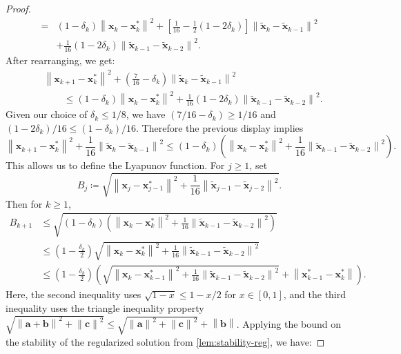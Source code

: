 \documentclass[letterpaper,11pt]{article}
\newcommand{\parenth}[1]{\left( #1 \right)}
\newcommand{\norm}[1]{\left\| #1 \right\|}
\newcommand{\vect}[1]{\mathbf{#1}}
\begin{document}
\begin{proof}
\begin{align*}
=& \left(1-\delta_k\right)\norm{\vect{x}_k - \vect{x}_k^*}^2 + \left[\frac{1}{16} - \frac{1}{2}\left(1- 2 \delta_k\right)\right]\norm{\tilde{\vect{x}}_k - \tilde{\vect{x}}_{k-1}}^2 \\
& + \frac{1}{16}\left(1-2\delta_k\right)\norm{\tilde{\vect{x}}_{k-1} - \tilde{\vect{x}}_{k-2}}^2.
\end{align*}
After rearranging, we get:
\[
\begin{aligned}
&\norm{\vect{x}_{k+1} - \vect{x}_k^*}^2
+ \parenth{\frac{7}{16} - \delta_k}
    \norm{\tilde{\vect{x}}_k - \tilde{\vect{x}}_{k-1}}^2 \\
&\qquad\le
\left(1-\delta_k\right)\norm{\vect{x}_k - \vect{x}_k^*}^2
+ \frac{1}{16}\left(1-2\delta_k\right)
    \norm{\tilde{\vect{x}}_{k-1} - \tilde{\vect{x}}_{k-2}}^2.
\end{aligned}
\]
Given our choice of $\delta_k \le 1/8$, we have \((7/16-\delta_k)\ge1/16\) and \((1-2\delta_k)/16\le(1-\delta_k)/16\). Therefore the previous display implies
\[
\norm{\vect{x}_{k+1} - \vect{x}_k^*}^2
+\frac{1}{16}\norm{\tilde{\vect{x}}_k - \tilde{\vect{x}}_{k-1}}^2
\le
(1-\delta_k)\left(
\norm{\vect{x}_{k} - \vect{x}_k^*}^2
+\frac{1}{16}\norm{\tilde{\vect{x}}_{k-1} - \tilde{\vect{x}}_{k-2}}^2
\right).
\]
This allows us to define the Lyapunov function. For \(j\ge1\), set
\[
B_j\coloneqq \sqrt{\norm{\vect{x}_{j} - \vect{x}_{j-1}^*}^2 + \frac{1}{16} \norm{\tilde{\vect{x}}_{j-1} - \tilde{\vect{x}}_{j-2}}^2}.
\]
Then for \(k\ge1\),
\begin{align*}
B_{k+1}
&\le \sqrt{\left(1 - \delta_k\right) \left( \norm{\vect{x}_{k} - \vect{x}_k^*}^2 + \frac{1}{16} \norm{\tilde{\vect{x}}_{k-1} - \tilde{\vect{x}}_{k-2}}^2 \right)} \\
&\le \parenth{1 - \frac{\delta_k}{2}} \sqrt{ \norm{\vect{x}_{k} - \vect{x}_k^*}^2 + \frac{1}{16} \norm{\tilde{\vect{x}}_{k-1} - \tilde{\vect{x}}_{k-2}}^2} \\
&\le \parenth{1 - \frac{\delta_k}{2}} \parenth{\sqrt{ \norm{\vect{x}_{k} - \vect{x}_{k-1}^*}^2 + \frac{1}{16} \norm{\tilde{\vect{x}}_{k-1} - \tilde{\vect{x}}_{k-2}}^2} + \norm{\vect{x}_{k-1}^* - \vect{x}_k^*}}.
\end{align*}
Here, the second inequality uses $\sqrt{1 - x} \le 1 - x/2$ for $x \in [0,1]$, and the third inequality uses the triangle inequality property $\sqrt{\norm{\vect{a} + \vect{b}}^2 + \norm{\vect{c}}^2} \le \sqrt{\norm{\vect{a}}^2 + \norm{\vect{c}}^2} + \norm{\vect{b}}$. Applying the bound on the stability of the regularized solution from \cref{lem:stability-reg}, we have:

\end{proof}
\end{document}
